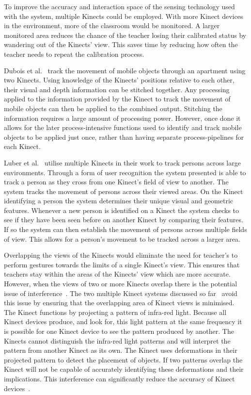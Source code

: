 \documentclass[link]{IWCOMP}
\begin{document}
To improve the accuracy and interaction space of the sensing technology used with the system, multiple Kinects could be employed.
With more Kinect devices in the environment, more of the classroom would be monitored.
A larger monitored area reduces the chance of the teacher losing their calibrated status by wandering out of the Kinects' view.
This saves time by reducing how often the teacher needs to repeat the calibration process.

Dubois et al.~\cite{Dubois2011} track the movement of mobile objects through an apartment using two Kinects.
Using knowledge of the Kinects' positions relative to each other, their visual and depth information can be stitched together.
Any processing applied to the information provided by the Kinect to track the movement of mobile objects can then be applied to the combined output.
Stitching the information requires a large amount of processing power.
However, once done it allows for the later process-intensive functions used to identify and track mobile objects to be applied just once, rather than having separate process-pipelines for each Kinect.

Luber et al.~\cite{Luber2011} utilise multiple Kinects in their work to track persons across large environments.
Through a form of user recognition the system presented is able to track a person as they cross from one Kinect's field of view to another.
The system tracks the movement of persons across their viewed areas.
On the Kinect identifying a person the system determines their unique visual and geometric features.
Whenever a new person is identified on a Kinect the system checks to see if they have been seen before on another Kinect by comparing their features.
If so the system can then establish the movement of persons across multiple fields of view.
This allows for a person's movement to be tracked across a larger area.

Overlapping the views of the Kinects would eliminate the need for teacher's to perform gestures towards the limits of a single Kinect's view.
This ensures that teachers stay within the areas of the Kinects' view which are more accurate.
However, when the views of two or more Kinects overlap there is the potential issue of interference~\cite{Satyavolu2012}.
The two multiple Kinect systems discussed so far~\cite{Dubois2011,Luber2011} avoid this issue by ensuring that the overlapping area of Kinect views is minimised.
The Kinect functions by projecting a pattern of infra-red light.
Because all Kinect devices produce, and look for, this light pattern at the same frequency it is possible for one Kinect device to see the pattern produced by another.
The Kinects cannot distinguish the infra-red light patterns and will interpret the pattern from another Kinect as its own.
The Kinect uses deformations in their projected pattern to detect the placement of objects.
If two patterns overlap the Kinect will not be capable of accurately identifying these deformations and their implications.
This interference can significantly reduce the accuracy of Kinect devices~\cite{Satyavolu2012}.
\end{document}
